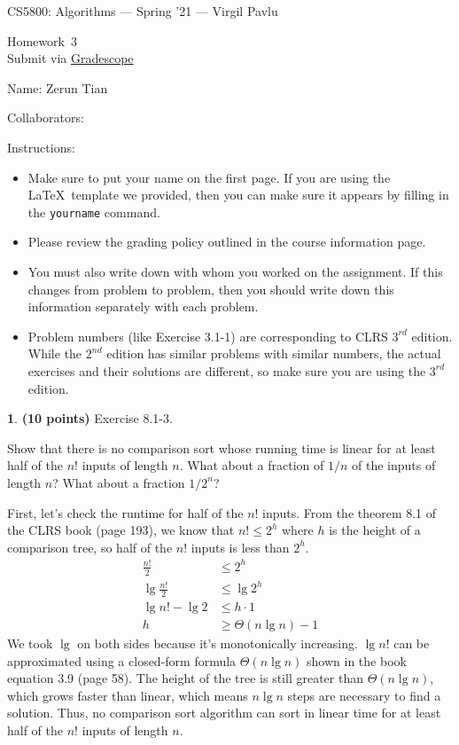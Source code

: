 \documentclass[11pt]{article}
\newcommand{\yourname}{Zerun Tian}
\newcommand{\yourcollaborators}{}
\theoremstyle{definition}
\newcommand{\instructor}{Virgil Pavlu}
\newcommand{\hwnum}{3}
\theoremstyle{theorem}
\newtheorem{prob}{}
\newcommand{\solution}{\medskip\noindent{\color{DarkBlue}\textbf{Solution:}}}
\begin{document}
{\Large 
\begin{center}{CS5800: Algorithms} --- Spring '21 --- \instructor \end{center}}
{\large
\vspace{10pt}
\noindent Homework~\hwnum \vspace{2pt}\\
Submit via \href{https://www.gradescope.com/courses/232127}{Gradescope}}

\bigskip
{\large \noindent Name: \yourname }

{\large \noindent Collaborators: \yourcollaborators}
\vspace{15pt}

{\large \noindent Instructions:}
\begin{itemize}
\item Make sure to put your name on the first page.  If you are using the \LaTeX~template we provided, then you can make sure it appears by filling in the \texttt{yourname} command.
\item Please review the grading policy outlined in the course information page.
\item You must also write down with whom you worked on the assignment.  If this changes from problem to problem, then you should write down this information separately with each problem.
\item Problem numbers (like Exercise 3.1-1) are corresponding to CLRS $3^{rd}$ edition.  While the  $2^{nd}$ edition  has  similar  problems  with  similar  numbers,  the  actual  exercises  and their solutions are different, so make sure you are using the $3^{rd}$ edition.
\end{itemize}

\newpage
\begin{prob} \textbf{(10 points)} Exercise 8.1-3.
\end{prob}
Show that there is no comparison sort whose running time is linear for at least half of the $n!$ inputs of length $n$. What about a fraction of $1/n$ of the inputs of length $n$? What about a fraction $1/2^n$?

\solution

First, let's check the runtime for half of the $n!$ inputs. From the theorem 8.1 of the CLRS book (page 193), we know that $n! \leq 2^h$ where $h$ is the height of a comparison tree, so half of the $n!$ inputs is less than $2^h$.
\[
\begin{split}
\frac{n!}{2} & \le 2^h \\
\lg{\frac{n!}{2} } & \le \lg{2^h} \\
\lg{n!} - \lg{2} & \le h \cdot 1 \\
h & \ge \Theta{(n\lg n)} - 1 
\end{split}
\]
We took $\lg$ on both sides because it's monotonically increasing. $\lg n!$ can be approximated using a closed-form formula $\Theta{(n\lg n)}$ shown in the book equation 3.9 (page 58). The height of the tree is still greater than $\Theta{(n\lg{n})}$, which grows faster than linear, which means $n \lg{n}$ steps are necessary to find a solution. Thus, no comparison sort algorithm can sort in linear time for at least half of the $n!$ inputs of length $n$.
\end{document}
